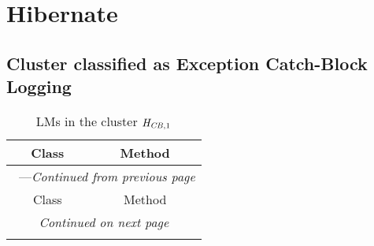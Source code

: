 \section{Hibernate}\label{hibernate}

\subsection{Cluster classified as Exception Catch-Block Logging}

\begin{center}
\begin{longtable}{ll}
\caption{LMs in the cluster $\mathit{H}_{\mathit{CB},1}$}\\
\toprule\multicolumn{1}{c}{Class}&\multicolumn{1}{c}{Method}\\\midrule
\endfirsthead

\multicolumn{2}{c}{\tablename\ \thetable{}---\textit{Continued from previous page}} \\\midrule
\multicolumn{1}{c}{Class}&\multicolumn{1}{c}{Method}\\\midrule
\endhead
\multicolumn{2}{c}{\textit{Continued on next page}}\\\midrule
\endfoot
\bottomrule
\endlastfoot


\end{longtable}
\end{center}
